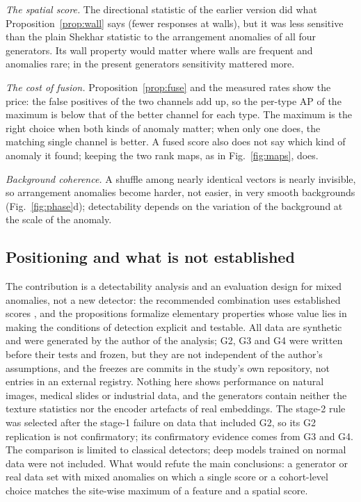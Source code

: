 \documentclass[preprint,review,12pt]{elsarticle}
\begin{document}
\emph{The spatial score.} The directional statistic of the earlier version did what Proposition~\ref{prop:wall} says (fewer responses at walls), but it was less sensitive than the plain Shekhar statistic to the arrangement anomalies of all four generators. Its wall property would matter where walls are frequent and anomalies rare; in the present generators sensitivity mattered more.

\emph{The cost of fusion.} Proposition~\ref{prop:fuse} and the measured rates show the price: the false positives of the two channels add up, so the per-type AP of the maximum is below that of the better channel for each type. The maximum is the right choice when both kinds of anomaly matter; when only one does, the matching single channel is better. A fused score also does not say which kind of anomaly it found; keeping the two rank maps, as in Fig.~\ref{fig:maps}, does.

\emph{Background coherence.} A shuffle among nearly identical vectors is nearly invisible, so arrangement anomalies become harder, not easier, in very smooth backgrounds (Fig.~\ref{fig:phase}d); detectability depends on the variation of the background at the scale of the anomaly.

\subsection{Positioning and what is not established}
The contribution is a detectability analysis and an evaluation design for mixed anomalies, not a new detector: the recommended combination uses established scores \citep{Liu2008,Shekhar2003}, and the propositions formalize elementary properties whose value lies in making the conditions of detection explicit and testable. All data are synthetic and were generated by the author of the analysis; G2, G3 and G4 were written before their tests and frozen, but they are not independent of the author's assumptions, and the freezes are commits in the study's own repository, not entries in an external registry. Nothing here shows performance on natural images, medical slides or industrial data, and the generators contain neither the texture statistics nor the encoder artefacts of real embeddings. The stage-2 rule was selected after the stage-1 failure on data that included G2, so its G2 replication is not confirmatory; its confirmatory evidence comes from G3 and G4. The comparison is limited to classical detectors; deep models trained on normal data were not included. What would refute the main conclusions: a generator or real data set with mixed anomalies on which a single score or a cohort-level choice matches the site-wise maximum of a feature and a spatial score.
\end{document}
